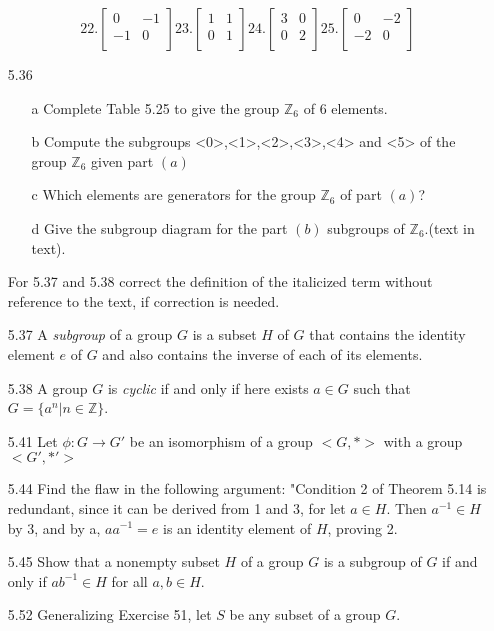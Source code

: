 \documentclass[12pt]{article}
\newcommand{\Z}{\mathds{Z}}
\begin{document}
\begin{enumerate}
		\[ 22.
		\begin{bmatrix}
		0   & -1 \\
		-1   & 0 \\
		\end{bmatrix}
		23.
		\begin{bmatrix}
		1   & 1 \\
		0   & 1 \\
		\end{bmatrix}
		24.
		\begin{bmatrix}
		3   & 0 \\
		0   & 2 \\
		\end{bmatrix}
		25.
		\begin{bmatrix}
		0   & -2 \\
		-2   & 0 \\
		\end{bmatrix}
		\]
		\item[5.36]
		 \begin{enumerate}
			\item[a] Complete Table 5.25 to give the group $\Z_6$ of 6 elements.
			
			\item[b] Compute the subgroups <0>,<1>,<2>,<3>,<4> and <5> of the group $\Z_6$ given part $(a)$
			
			\item[c] Which elements are generators for the group $\Z_6$ of part $(a)$?
			
			\item[d] Give the subgroup diagram for the part $(b)$ subgroups of $\Z_6$.(text in text).
		\end{enumerate}
			
		For 5.37 and 5.38 correct the definition of the italicized term without reference to the text, if correction is needed.
		\item[5.37] A \textit{subgroup} of a group $G$ is a subset $H$ of $G$ that contains the identity element $e$ of $G$ and also contains the inverse of each of its elements.
		\item[5.38] A group $G$ is \textit{cyclic} if and only if here exists $a \in G$ such that $G = \{a^n|n\in\Z\}$.
		\item[5.41] Let $\phi: G \rightarrow G'$ be an isomorphism of a group $<G, *>$ with a group $<G', *'>$
		\item[5.44] Find the flaw in the following argument: "Condition 2 of Theorem 5.14 is redundant, since it can be derived from 1 and 3, for let $a \in H$. Then $a^{-1}\in H$ by 3, and by a, $aa^{-1} = e$ is an identity element of $H$, proving 2.
		\item[5.45] Show that a nonempty subset $H$ of a group $G$ is a subgroup of $G$ if and only if $ab^{-1}\in H$ for all $a,b \in H$.
		\item[5.52] Generalizing Exercise 51, let $S$ be any subset of a group $G$.
		

\end{enumerate}
\end{document}
